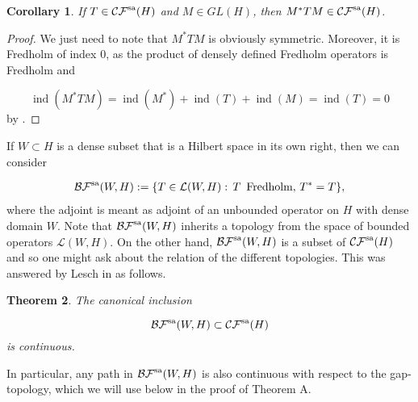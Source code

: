\documentclass[a4paper,10pt]{article}
\newtheorem{theorem}{Theorem}[section]
\newtheorem{cor}[theorem]{Corollary}
\DeclareMathOperator{\ind}{ind}
\begin{document}
\begin{cor}\label{cor-orthequ}
If $T\in\mathcal{CF}^\textup{sa}(H)$ and $M\in GL(H)$, then $M^\ast TM\in\mathcal{CF}^\textup{sa}(H)$.
\end{cor}

\begin{proof}
We just need to note that $M^\ast TM$ is obviously symmetric. Moreover, it is Fredholm of index $0$, as the product of densely defined Fredholm operators is Fredholm and 

\[\ind(M^\ast TM)=\ind(M^\ast)+\ind(T)+\ind(M)=\ind(T)=0\]
by \cite[Thm. XVIII 3.1]{Gohberg}.
\end{proof}
\noindent
If $W\subset H$ is a dense subset that is a Hilbert space in its own right, then we can consider

\begin{align}\label{BF}
\mathcal{BF}^\textup{sa}(W,H):=\{T\in\mathcal{L}(W,H):\, T\,\text{ Fredholm},\, T^\ast=T\},
\end{align}
where the adjoint is meant as adjoint of an unbounded operator on $H$ with dense domain $W$. Note that $\mathcal{BF}^\textup{sa}(W,H)$ inherits a topology from the space of bounded operators $\mathcal{L}(W,H)$. On the other hand, $\mathcal{BF}^\textup{sa}(W,H)$ is a subset of $\mathcal{CF}^\textup{sa}(H)$ and so one might ask about the relation of the different topologies. This was answered by Lesch in \cite[Prop. 2.2]{Lesch} as follows.

\begin{theorem}\label{Leschincl}
The canonical inclusion 

\[\mathcal{BF}^\textup{sa}(W,H)\subset\mathcal{CF}^\textup{sa}(H)\]
is continuous.
\end{theorem}  
\noindent
In particular, any path in $\mathcal{BF}^\textup{sa}(W,H)$ is also continuous with respect to the gap-topology, which we will use below in the proof of Theorem A.

\end{document}
